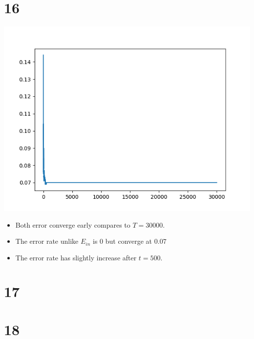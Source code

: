 \documentclass[12pt]{article}
\begin{document}
\section*{16}
\begin{center}
    \includegraphics[scale=0.5]{p16.png}
\end{center}
\begin{itemize}
\item Both error converge early compares to $T=30000$. 
\item The error rate unlike $E_{in}$ is $0$ but converge at $0.07$
\item The error rate has slightly increase after $t=500$.
\end{itemize}

\section*{17}
\section*{18}
\end{document}
